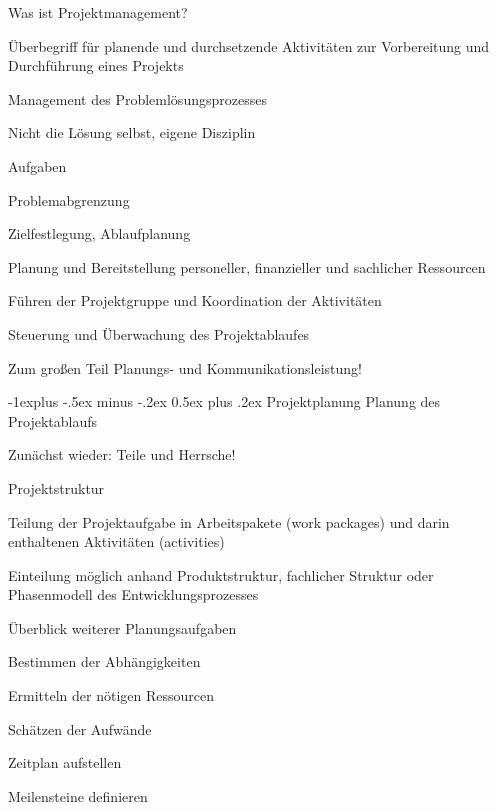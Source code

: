 \documentclass[a4paper]{article}
\makeatletter
\renewcommand{\subsection}{\@startsection{subsection}{2}{0mm}%
                                {-1explus -.5ex minus -.2ex}%
                                {0.5ex plus .2ex}%
                                {\normalfont\normalsize\bfseries}}
\makeatother
\begin{document}
\begin{multicols}{3}
  Was ist Projektmanagement?
  \begin{itemize*}
    \item Überbegriff für planende und durchsetzende Aktivitäten zur Vorbereitung und Durchführung eines Projekts
    \item Management des Problemlösungsprozesses
          \begin{itemize*}
            \item Nicht die Lösung selbst, eigene Disziplin
          \end{itemize*}
    \item Aufgaben
          \begin{itemize*}
            \item Problemabgrenzung
            \item Zielfestlegung, Ablaufplanung
            \item Planung und Bereitstellung personeller, finanzieller und sachlicher Ressourcen
            \item Führen der Projektgruppe und Koordination der Aktivitäten
            \item Steuerung und Überwachung des Projektablaufes
            \item Zum großen Teil Planungs- und Kommunikationsleistung!
          \end{itemize*}
  \end{itemize*}

  \subsection{Projektplanung}
  Planung des Projektablaufs
  \begin{itemize*}
    \item Zunächst wieder: Teile und Herrsche!
    \item Projektstruktur
          \begin{itemize*}
            \item Teilung der Projektaufgabe in Arbeitspakete (work packages) und darin enthaltenen Aktivitäten (activities)
            \item Einteilung möglich anhand Produktstruktur, fachlicher Struktur oder Phasenmodell des Entwicklungsprozesses
          \end{itemize*}
    \item Überblick weiterer Planungsaufgaben
          \begin{itemize*}
            \item Bestimmen der Abhängigkeiten
            \item Ermitteln der nötigen Ressourcen
            \item Schätzen der Aufwände
            \item Zeitplan aufstellen
            \item Meilensteine definieren
          \end{itemize*}
  \end{itemize*}


\end{multicols}
\end{document}
